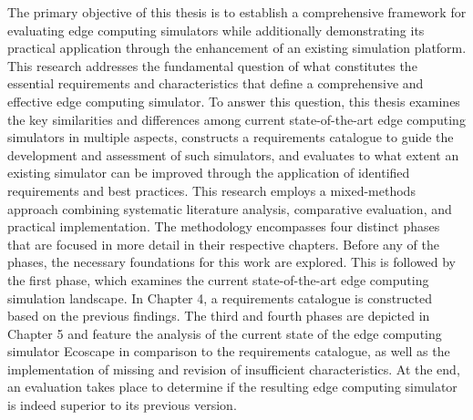The primary objective of this thesis is to establish a comprehensive framework for evaluating edge computing simulators while additionally demonstrating its practical application through the enhancement of an existing 
simulation platform. This research addresses the fundamental question of what constitutes the essential requirements and characteristics that define a comprehensive and effective edge computing simulator. 
To answer this question, this thesis examines the key similarities and differences among current state-of-the-art edge computing simulators in multiple aspects, constructs a requirements catalogue to guide the 
development and assessment of such simulators, and evaluates to what extent an existing simulator can be improved through the application of identified requirements and best practices.
This research employs a mixed-methods approach combining systematic literature analysis, comparative evaluation, and practical implementation. 
The methodology encompasses four distinct phases that are focused in more detail in their respective chapters. 
Before any of the phases, the necessary foundations for this work are explored. 
This is followed by the first phase, which examines the current state-of-the-art edge computing simulation landscape. 
In Chapter 4, a requirements catalogue is constructed based on the previous findings. 
The third and fourth phases are depicted in Chapter 5 and feature the analysis of the current state of the edge computing simulator Ecoscape in 
comparison to the requirements catalogue, as well as the implementation of missing and revision of insufficient characteristics. 
At the end, an evaluation takes place to determine if the resulting edge computing simulator is indeed superior to its previous version.